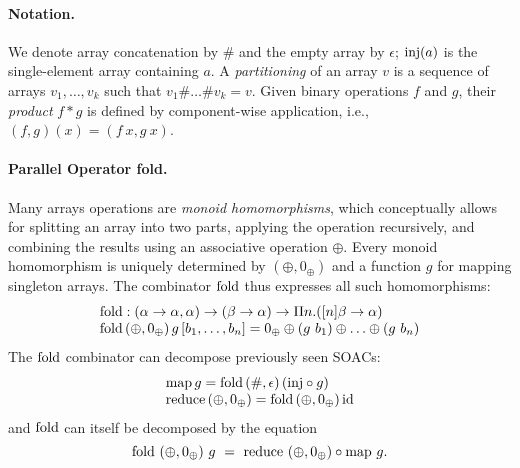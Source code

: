 \paragraph{Notation.}

We denote array concatenation by $\#$ and the empty array by $\epsilon$;
$\mathrm{inj}(a)$ is the single-element array containing $a$.
A \emph{partitioning} of an array $v$ is a sequence of arrays $v_1, \ldots, v_k$ such
that $v_1 \# \ldots \# v_k = v$.
%
Given binary operations $f$ and $g$, their \emph{product} $f * g$ is defined by
component-wise application, i.e., $(f, g) (x) = (f~x, g~x)$.
%
%

\paragraph{Parallel Operator fold.}

Many arrays operations are \emph{monoid homomorphisms}, which
conceptually allows for splitting an array into two parts, applying
the operation recursively, and combining the results using an
associative operation $\oplus$.
%
Every monoid homomorphism is uniquely determined by
$(\oplus,0_{\oplus})$ and a function $g$ for mapping singleton
arrays. The combinator $\mathrm{fold}$ thus expresses all such homomorphisms:
\[ \begin{array}{l}
\mathrm{fold} : (\alpha \to \alpha, \alpha) \to (\beta \to \alpha) \to \Pi n. ([n]\beta \to \alpha) \\
\mathrm{fold} \,(\oplus, 0_{\oplus}) \,g\, [b_1, \ldots, b_n] = 0_{\oplus} \oplus (g~b_1) \oplus \ldots \oplus (g~b_n)
\end{array} \]
The $\mathrm{fold}$ combinator can decompose previously seen SOACs:
\[ \begin{array}{l}
\mathrm{map} \, g = \mathrm{fold}\, (\#, \epsilon)\, (\mathrm{inj} \circ g) \\
\mathrm{reduce}\, (\oplus, 0_{\oplus}) = \mathrm{fold}\, (\oplus, 0_{\oplus})\, \mathrm{id}
\end{array} \]
and $\mathrm{fold}$ can itself be decomposed by the equation
\[
  \mathrm{fold} ~ (\oplus,0_{\oplus}) ~ g ~ = ~ \mathrm{reduce} ~ (\oplus,0_{\oplus}) \circ \mathrm{map} ~ g.
\]


